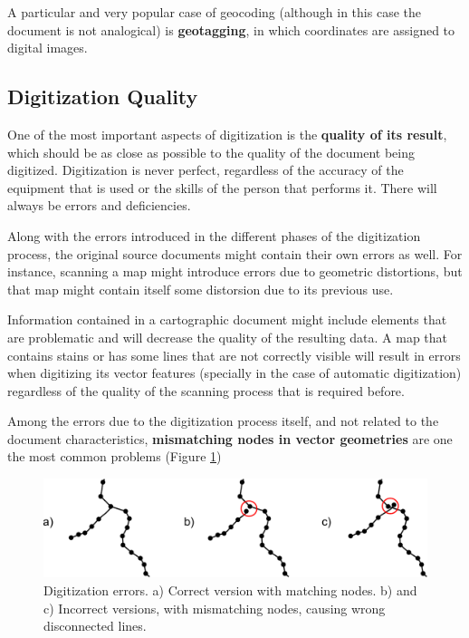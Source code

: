 A particular and very popular case of geocoding (although in this case the document is not analogical) is \textbf{geotagging}, in which coordinates are assigned to digital images.


\subsection{Digitization Quality}

One of the most important aspects of digitization is the \textbf{quality of its result}, which should be as close as possible to the quality of the document being digitized. Digitization is never perfect, regardless of the accuracy of the equipment that is used or the skills of the person that performs it. There will always be errors and deficiencies.

Along with the errors introduced in the different phases of the digitization process, the original source documents might contain their own errors as well. For instance, scanning a map might introduce errors due to geometric distortions, but that map might contain itself some distorsion due to its previous use.

Information contained in a cartographic document might include elements that are problematic and will decrease the quality of the resulting data. A map that contains stains or has some lines that are not correctly visible will result in errors when digitizing its vector features (specially in the case of automatic digitization) regardless of the quality of the scanning process that is required before. 
 
Among the errors due to the digitization process itself, and not related to the document characteristics, \textbf{mismatching nodes in vector geometries} are one the most common problems (Figure \ref{Fig:Errors_digitization})

\begin{figure}[!hbt]   
\centering
\includegraphics[width=\textwidth]{Data_sources/Errors_digitization.pdf}
\caption{\small Digitization errors. a) Correct version with matching nodes. b) and c) Incorrect versions, with mismatching nodes, causing wrong disconnected lines.}
\label{Fig:Errors_digitization} 
\end{figure}


